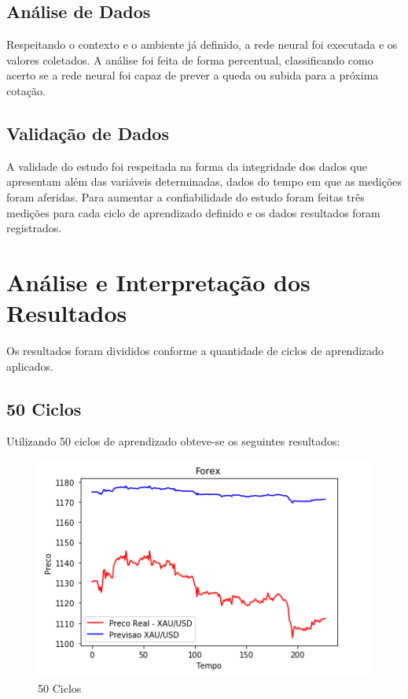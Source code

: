 \subsection[Análise de Dados]{Análise de Dados}

Respeitando o contexto e o ambiente já definido, a rede neural foi executada e os valores coletados. A análise foi feita de forma percentual,
classificando como acerto se a rede neural foi capaz de prever a queda ou subida para a próxima cotação.

\subsection[Validação de Dados]{Validação de Dados}

A validade do estudo foi respeitada na forma da integridade dos dados que apresentam além das variáveis determinadas, dados do tempo em que
as medições foram aferidas.
Para aumentar a confiabilidade do estudo foram feitas três medições para cada ciclo de aprendizado definido e os dados resultados foram registrados.

\section[Análise e Interpretação dos Resultados]{Análise e Interpretação dos Resultados}

Os resultados foram divididos conforme a quantidade de ciclos de aprendizado aplicados.

\pagebreak

\subsection[50 Ciclos]{50 Ciclos}

Utilizando 50 ciclos de aprendizado obteve-se os seguintes resultados:

\begin{figure}[h]
	\centering
	\includegraphics[keepaspectratio=true,scale=0.8]{figuras/50high.png}
	\caption{50 Ciclos}
	\label{fig15}
\end{figure}

